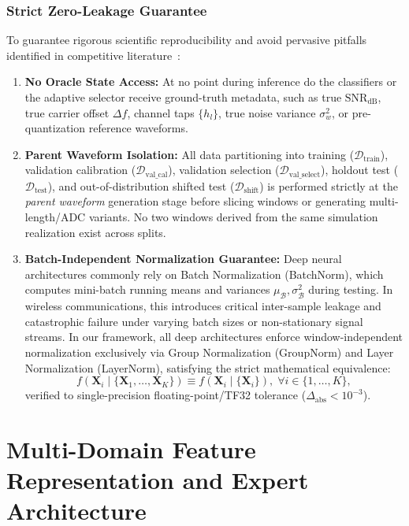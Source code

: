 \subsubsection{Strict Zero-Leakage Guarantee}
To guarantee rigorous scientific reproducibility and avoid pervasive pitfalls identified in competitive literature~\cite{gao2026mlea, li2026openset}:
\begin{enumerate}
    \item \textbf{No Oracle State Access:} At no point during inference do the classifiers or the adaptive selector receive ground-truth metadata, such as true $\text{SNR}_{\text{dB}}$, true carrier offset $\Delta f$, channel taps $\{h_l\}$, true noise variance $\sigma_w^2$, or pre-quantization reference waveforms.
    \item \textbf{Parent Waveform Isolation:} All data partitioning into training ($\mathcal{D}_{\text{train}}$), validation calibration ($\mathcal{D}_{\text{val\_cal}}$), validation selection ($\mathcal{D}_{\text{val\_select}}$), holdout test ($\mathcal{D}_{\text{test}}$), and out-of-distribution shifted test ($\mathcal{D}_{\text{shift}}$) is performed strictly at the \textit{parent waveform} generation stage before slicing windows or generating multi-length/ADC variants. No two windows derived from the same simulation realization exist across splits.
    \item \textbf{Batch-Independent Normalization Guarantee:} Deep neural architectures commonly rely on Batch Normalization (BatchNorm), which computes mini-batch running means and variances $\mu_{\mathcal{B}}, \sigma^2_{\mathcal{B}}$ during testing. In wireless communications, this introduces critical inter-sample leakage and catastrophic failure under varying batch sizes or non-stationary signal streams. In our framework, all deep architectures enforce window-independent normalization exclusively via Group Normalization (GroupNorm) and Layer Normalization (LayerNorm), satisfying the strict mathematical equivalence:
    \begin{equation}
    f(\mathbf{X}_i \mid \{\mathbf{X}_1,\dots,\mathbf{X}_K\}) \equiv f(\mathbf{X}_i \mid \{\mathbf{X}_i\}),\; \forall i \in \{1,\dots,K\},
    \label{eq:batch_independence_theorem}
    \end{equation}
    verified to single-precision floating-point/TF32 tolerance ($\Delta_{\text{abs}} < 10^{-3}$).
\end{enumerate}

\section{Multi-Domain Feature Representation and Expert Architecture}
\label{sec:architecture}


